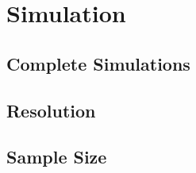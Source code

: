 \section{Simulation}
\label{sec:simulation}
	
	\subsection{Complete Simulations}
	\label{ssec:comp-sim}
	
	
	
	\subsection{Resolution}
	\label{ssec:resolution}
	
	
	
	\subsection{Sample Size}
	\label{ssec:samp-size}
	
	

